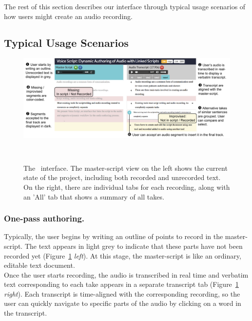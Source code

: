 The rest of this section describes our interface through typical usage scenarios of how users might create an audio recording. 
%
\subsection{Typical Usage Scenarios}
%
\begin{figure}
  \centering
  \includegraphics[width=\textwidth]{figures/ui_aligned2}
  \caption{The \voicescript\ interface. The master-script view on the left shows the current state of the project, including both recorded and unrecorded text. On the right, there are individual tabs for each recording, along with an 'All' tab that shows a summary of all takes.}~\label{fig:ui_aligned}
\end{figure}
%

\subsubsection{One-pass authoring.} 
Typically, the user begins by writing an outline of points to record in the master-script.
The text appears in light grey to indicate that these parts have not been recorded yet (Figure~\ref{fig:ui_aligned} \textit{left}). At this stage, the master-script is like an ordinary, editable text document. \\

Once the user starts recording, the audio is transcribed in real time and verbatim text corresponding to each take appears in a separate transcript tab (Figure~\ref{fig:ui_aligned} \textit{right}). Each transcript is time-aligned with the corresponding recording, so the user can quickly navigate to specific
parts of the audio by clicking on a word in the transcript. \\

